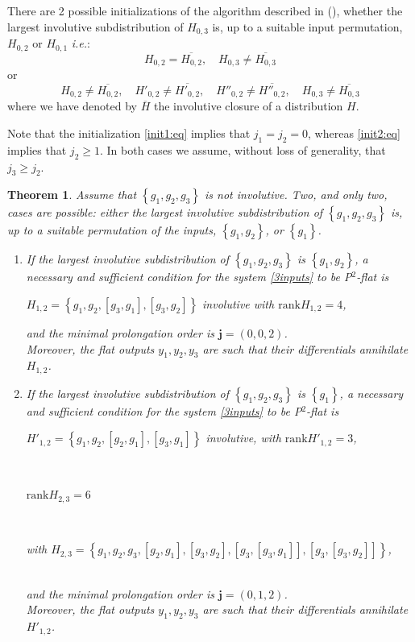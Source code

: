 \documentclass[10pt]{article}
\newcommand{\3}{\mathbf{3}}
\newcommand{\2}{\mathbf{2}}
\newcommand{\1}{\mathbf{1}}
\newcommand{\0}{\mathbf{0}}
\newcommand{\ie}{\textsl{i.e.}}
\newcommand{\mbf}[1]{\mathbf{#1}}
\newcommand{\rk}{\mathrm{rank}}
\newcommand{\ol}[1]{\overline{#1}}
\newtheorem{thm}{Theorem}
\begin{document}
There are 2 possible initializations of the algorithm described in (\cite[Section 4.3]{Levine2023}), whether the largest involutive subdistribution of $H_{0,3}$ is, up to a suitable input permutation, $H_{0,2}$ or $H_{0,1}$ \ie:
\begin{equation}\label{init1:eq}
H_{0,2} = \ol{H_{0,2}}, \quad H_{0,3} \neq \ol{H_{0,3}}
\end{equation}
or
\begin{equation}\label{init2:eq}
H_{0,2} \neq \ol{H_{0,2}}, \quad H'_{0,2} \neq \ol{H'_{0,2}}, \quad H''_{0,2} \neq \ol{H''_{0,2}}, \quad
H_{0,3} \neq \ol{H_{0,3}}
\end{equation}
where we have denoted by $\overline{H}$ the involutive closure of a distribution $H$.


Note that the initialization \eqref{init1:eq} implies that $j_{1} = j_{2}=0$, whereas \eqref{init2:eq} implies that $j_{2}\geq 1$. In both cases we assume, without loss of generality, that $j_{3}\geq j_{2}$.





\begin{thm}
\label{3-6theorem}
Assume that $\left\{ g_{1}, g_{2}, g_{3}\right\}$ is not involutive. Two, and only two, cases are possible: either the largest involutive subdistribution of $\left\{ g_{1}, g_{2}, g_{3}\right\}$ is, up to a suitable permutation of the inputs, $\left\{ g_{1}, g_{2}\right\}$, or $\left\{ g_{1} \right\}$.
\begin{enumerate}
\item If the largest involutive subdistribution of $\left\{ g_{1}, g_{2}, g_{3}\right\}$ is $\left\{ g_{1}, g_{2}\right\}$,  a necessary and sufficient condition for the system \eqref{3inputs} to be P$^{2}$-flat is \\
\centerline{$H_{1,2} =  \left\{g_{1}, g_{2}, [g_{3},g_{1}], [g_{3},g_{2}]\right\}$ involutive with $\rk H_{1,2} = 4$, }
and the minimal prolongation order is $\mbf{j}= (0,0,2)$. \\
Moreover, the flat outputs $y_1,y_2,y_3$ are such that their differentials annihilate $H_{1,2}$.

\item If the largest involutive subdistribution of $\left\{ g_{1}, g_{2}, g_{3}\right\}$ is $\left\{ g_{1} \right\}$,  a necessary and sufficient condition for the system \eqref{3inputs} to be P$^{2}$-flat is \\
\centerline{$H'_{1,2} =  \left\{g_{1}, g_{2}, [g_{2},g_{1}], [g_{3},g_{1}]\right\}$ involutive, with $\rk H' _{1,2} = 3$,}\\
\centerline{$\rk H_{2,3} = 6$} \\
\centerline{ with $H_{2,3} = \left\{g_{1}, g_{2}, g_{3}, [g_{2},g_{1}], [g_{3},g_{2}], [g_{3},[g_{3},g_{1}]], [g_{3},[g_{3},g_{2}]] \right\}$,}\\
 and the minimal prolongation order is $\mbf{j}= (0,1,2)$. \\
 Moreover, the flat outputs $y_1,y_2,y_3$ are such that their differentials annihilate $H'_{1,2}$.
\end{enumerate}
\end{thm}
\end{document}

